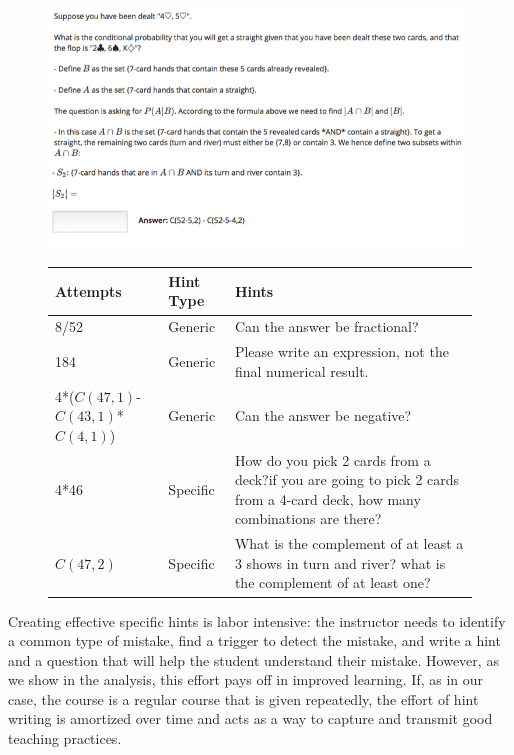 \documentclass{llncs2e/llncs}
\begin{document}
\begin{figure}[t!]
  \centering
	\includegraphics[width=0.99\textwidth]{image/problem.png}
\begin{center}
  \begin{tabular}{ p{2.5cm}  p{1.5cm}  p{7.5cm} }
    Attempts & Hint Type & Hints \\ \hline
    8/52 & Generic & Can the answer be fractional? \\ \hline
    184 & Generic & Please write an expression, not the final numerical result. \\ \hline
    4*($C(47,1)$-$C(43,1)$*$C(4,1)$) & Generic & Can the answer be negative? \\ \hline
   4*46 & Specific & How do you pick 2 cards from a deck?if you are going to pick 2 cards from a 4-card deck, how many combinations are there? \\ \hline
   $C(47,2)$ & Specific & What is the complement of at least a 3 shows in turn and river? what is the complement of at least one? \\
  \end{tabular}
  \label{fig:hints_sent}
  \end{center}
\end{figure}

Creating effective specific hints is labor intensive: the instructor needs to identify a common type of mistake, find a trigger to detect the mistake, and write a hint and a question that will help the student understand their mistake. However, as we show in the analysis, this effort pays off in improved learning. If, as in our case, the course is a regular course that is given repeatedly, the effort of hint writing is amortized over time and acts as a way to capture and transmit good teaching practices.
\end{document}

